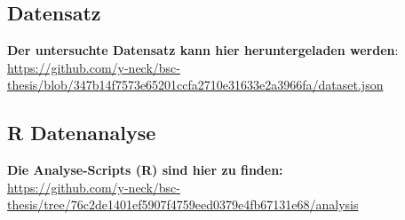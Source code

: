 \documentclass[12pt,a4paper]{article}        %
\begin{document}
\subsection{Datensatz}
\label{appendix_dataset}
\begin{tcolorbox}[
    width=\textwidth,    %
    boxrule=1pt,         %
    arc=0pt,             %
    colback=white,       %
    left=6pt, right=6pt, top=6pt, bottom=6pt
  ]
  \textbf{Der untersuchte Datensatz kann hier heruntergeladen werden}: \\
  \url{https://github.com/y-neck/bsc-thesis/blob/347b14f7573e65201ccfa2710e31633e2a3966fa/dataset.json}
\end{tcolorbox}
\subsection{R Datenanalyse}
\label{appendix_analysis}
\begin{tcolorbox}[
    width=\textwidth,
    boxrule=1pt,
    arc=0pt,
    colback=white,
    left=6pt, right=6pt, top=6pt, bottom=6pt
  ]
  \textbf{Die Analyse-Scripts (R) sind hier zu finden:}\\
  \url{https://github.com/y-neck/bsc-thesis/tree/76c2de1401ef5907f4759eed0379e4fb67131e68/analysis}
\end{tcolorbox}
\end{document}
